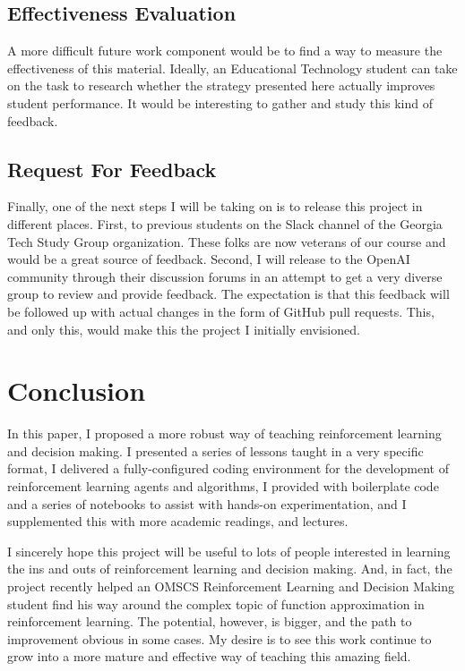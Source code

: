\documentclass[11pt]{article} %
\begin{document}
\subsection{Effectiveness Evaluation}

A more difficult future work component would be to find a way to measure the effectiveness
of this material. Ideally, an Educational Technology student can take on the task
to research whether the strategy presented here actually improves student
performance. It would be interesting to gather and study this kind of feedback.

\subsection{Request For Feedback}

Finally, one of the next steps I will be taking on is to release this project
in different places. First, to previous students on the Slack channel of the
Georgia Tech Study Group organization. These folks are now veterans of our course
and would be a great source of feedback. Second, I will release to the OpenAI
community through their discussion forums in an attempt to get a very diverse group
to review and provide feedback. The expectation is that this feedback will be
followed up with actual changes in the form of GitHub pull requests. This, and only
this, would make this the project I initially envisioned. 

\section{Conclusion}

In this paper, I proposed a more robust way of teaching reinforcement learning
and decision making. I presented a series of lessons taught in a very specific
format, I delivered a fully-configured coding environment for the development
of reinforcement learning agents and algorithms, I provided with boilerplate
code and a series of notebooks to assist with hands-on experimentation, and I
supplemented this with more academic readings, and lectures.

I sincerely hope this project will be useful to lots of people interested in
learning the ins and outs of reinforcement learning and decision making. And,
in fact, the project recently helped an OMSCS Reinforcement Learning and
Decision Making student find his way around the complex topic of function
approximation in reinforcement learning. The potential, however, is bigger, and
the path to improvement obvious in some cases. My desire is to see this
work continue to grow into a more mature and effective way of teaching this
amazing field.
\end{document}
